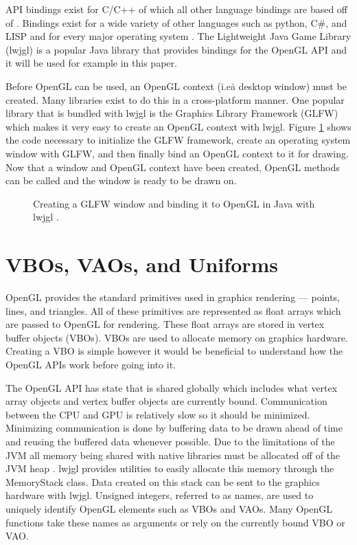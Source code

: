 \documentclass{article}
\begin{document}
API bindings exist for C/C++ of which all other language bindings are based off of \cite{openglwiki2018}. Bindings exist for a wide variety of other languages such as python, C\#, and LISP and for every major operating system \cite{openglwiki2018}. The Lightweight Java Game Library (lwjgl) is a popular Java library that provides bindings for the OpenGL API and it will be used for example in this paper.

Before OpenGL can be used, an OpenGL context (i.e\. a desktop window) must be created. Many libraries exist to do this in a cross-platform manner. One popular library that is bundled with lwjgl is the Graphics Library Framework (GLFW) which makes it very easy to create an OpenGL context with lwjgl. Figure \ref{fig:glfw-creation} shows the code necessary to initialize the GLFW framework, create an operating system window with GLFW, and then finally bind an OpenGL context to it for drawing. Now that a window and OpenGL context have been created, OpenGL methods can be called and the window is ready to be drawn on.

\begin{figure}[h]
	
	\caption{Creating a GLFW window and binding it to OpenGL in Java with lwjgl \cite{lwjgl}.}
	\label{fig:glfw-creation}
\end{figure}

\section{VBOs, VAOs, and Uniforms}
OpenGL provides the standard primitives used in graphics rendering --- points, lines, and triangles. All of these primitives are represented as float arrays which are passed to OpenGL for rendering. These float arrays are stored in vertex buffer objects (VBOs). VBOs are used to allocate memory on graphics hardware. Creating a VBO is simple however it would be beneficial to understand how the OpenGL APIs work before going into it.

The OpenGL API has state that is shared globally which includes what vertex array objects and vertex buffer objects are currently bound. Communication between the CPU and GPU is relatively slow so it should be minimized. Minimizing communication is done by buffering data to be drawn ahead of time and reusing the buffered data whenever possible. Due to the limitations of the JVM all memory being shared with native libraries must be allocated off of the JVM heap \cite{lwjglwiki}. lwjgl provides utilities to easily allocate this memory through the MemoryStack class. Data created on this stack can be sent to the graphics hardware with lwjgl. Unsigned integers, referred to as names, are used to uniquely identify OpenGL elements such as VBOs and VAOs. Many OpenGL functions take these names as arguments or rely on the currently bound VBO or VAO.
\end{document}
